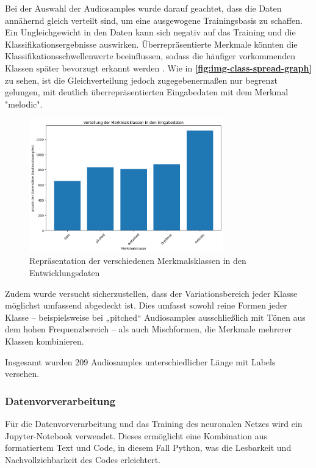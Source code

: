 Bei der Auswahl der Audiosamples wurde darauf geachtet, dass die Daten annähernd gleich verteilt sind, um eine ausgewogene Trainingsbasis zu schaffen. Ein Ungleichgewicht in den Daten kann sich negativ auf das Training und die Klassifikationsergebnisse auswirken. Überrepräsentierte Merkmale könnten die Klassifikationsschwellenwerte beeinflussen, sodass die häufiger vorkommenden Klassen später bevorzugt erkannt werden \cite{nn-imbalance-input-data}. Wie in \textbf{\autoref{fig:img-class-spread-graph}} zu sehen, ist die Gleichverteilung jedoch zugegebenermaßen nur begrenzt gelungen, mit deutlich überrepräsentierten Eingabedaten mit dem Merkmal "melodic".

\begin{figure}[h!]
\centering
\includegraphics[width=0.75\textwidth]{images/08_durchfuehrung/nn/class_spread_plot.png}
\caption{Repräsentation der verschiedenen Merkmalsklassen in den Entwicklungsdaten}
\label{fig:img-class-spread-graph}
\end{figure}

Zudem wurde versucht sicherzustellen, dass der Variationsbereich jeder Klasse möglichst umfassend abgedeckt ist. Dies umfasst sowohl reine Formen jeder Klasse – beispielsweise bei „pitched“ Audiosamples ausschließlich mit Tönen aus dem hohen Frequenzbereich – als auch Mischformen, die Merkmale mehrerer Klassen kombinieren.

Insgesamt wurden 209 Audiosamples unterschiedlicher Länge mit Labels versehen.

\subsubsection{Datenvorverarbeitung}
\label{sec:data-preprocessing}

Für die Datenvorverarbeitung und das Training des neuronalen Netzes wird ein Jupyter-Notebook verwendet. Dieses ermöglicht eine Kombination aus formatiertem Text und Code, in diesem Fall Python, was die Lesbarkeit und Nachvollziehbarkeit des Codes erleichtert.

